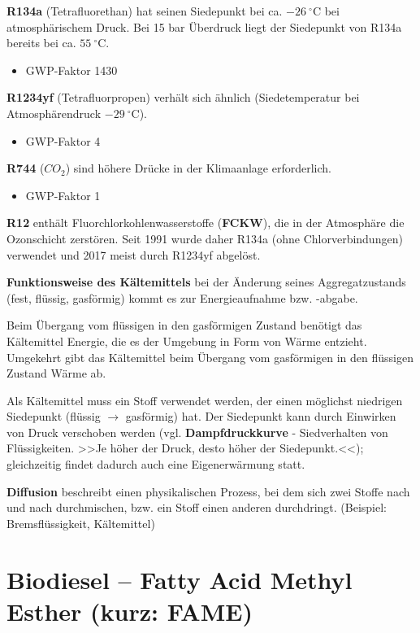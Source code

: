 \textbf{R134a} (Tetrafluorethan) hat seinen Siedepunkt bei ca.
$-26~^\circ\text{C}$ bei atmosphärischem Druck. Bei 15 bar Überdruck
liegt der Siedepunkt von R134a bereits bei ca. $55~^\circ\text{C}$.

\begin{itemize}
\item
  GWP-Faktor 1430
\end{itemize}

\textbf{R1234yf} (Tetrafluorpropen) verhält sich ähnlich
(Siedetemperatur bei Atmosphärendruck $-29~^\circ\text{C}$).

\begin{itemize}
\item
  GWP-Faktor 4
\end{itemize}

\textbf{R744} ($CO_2$) sind höhere Drücke in der Klimaanlage
erforderlich.

\begin{itemize}
\item
  GWP-Faktor 1
\end{itemize}

\textbf{R12} enthält Fluorchlorkohlenwasserstoffe (\textbf{FCKW}), die
in der Atmosphäre die Ozonschicht zerstören. Seit 1991 wurde daher R134a
(ohne Chlorverbindungen) verwendet und 2017 meist durch R1234yf
abgelöst.

\textbf{Funktionsweise des Kältemittels} bei der Änderung seines
Aggregatzustands (fest, flüssig, gasförmig) kommt es zur Energieaufnahme
bzw. -abgabe.

Beim Übergang vom flüssigen in den gasförmigen Zustand benötigt das
Kältemittel Energie, die es der Umgebung in Form von Wärme entzieht.
Umgekehrt gibt das Kältemittel beim Übergang vom gasförmigen in den
flüssigen Zustand Wärme ab.

Als Kältemittel muss ein Stoff verwendet werden, der einen möglichst
niedrigen Siedepunkt (flüssig $\to$ gasförmig) hat. Der Siedepunkt
kann durch Einwirken von Druck verschoben werden (vgl.
\textbf{Dampfdruckkurve} - Siedverhalten von Flüssigkeiten. >>Je höher
der Druck, desto höher der Siedepunkt.<<); gleichzeitig findet dadurch
auch eine Eigenerwärmung statt.

\textbf{Diffusion} beschreibt einen physikalischen Prozess, bei dem sich
zwei Stoffe nach und nach durchmischen, bzw. ein Stoff einen anderen
durchdringt. (Beispiel: Bremsflüssigkeit, Kältemittel)

\section{Biodiesel -- Fatty Acid Methyl Esther (kurz:
FAME)}\label{biodiesel-fatty-acid-methyl-esther-kurz-fame}

